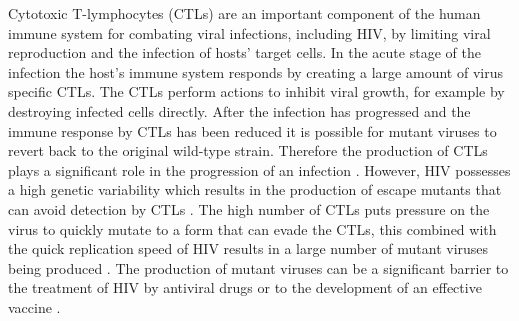 \documentclass[11pt, oneside]{article}    %
\begin{document}
\vspace{5mm}

	Cytotoxic T-lymphocytes (CTLs) are an important component of the human immune system for combating viral infections, including HIV, by limiting viral reproduction and the infection of hosts’ target cells. In the acute stage of the infection the host’s immune system responds by creating a large amount of virus specific CTLs. The CTLs perform actions to inhibit viral growth, for example by destroying infected cells directly. After the infection has progressed and the immune response by CTLs has been reduced it is possible for mutant viruses to revert back to the original wild-type strain. Therefore the production of CTLs plays a significant role in the progression of an infection \cite{Greenough}. However, HIV possesses a high genetic variability which results in the production of escape mutants that can avoid detection by CTLs \cite{Boutwell}. The high number of CTLs puts pressure on the virus to quickly mutate to a form that can evade the CTLs, this combined with the quick replication speed of HIV results in a large number of mutant viruses being produced \cite{Deng, Ribeiro}. The production of mutant viruses can be a significant barrier to the treatment of HIV by antiviral drugs or to the development of an effective vaccine \cite{Boutwell}.

\vspace{5mm}


	


\end{document}
